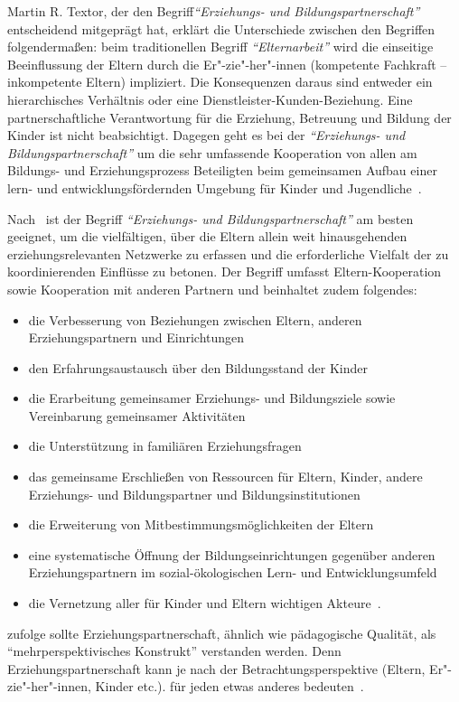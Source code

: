 \documentclass[12pt,a4paper]{article}
\begin{document}
Martin R. Textor, der den Begriff\textit{"`Erziehungs- und Bildungspartnerschaft"'} entscheidend mitgeprägt hat, erklärt die Unterschiede zwischen den Begriffen folgendermaßen: beim traditionellen Begriff \textit{"`Elternarbeit"'} wird die einseitige Beeinflussung der Eltern durch die Er"-zie"-her"-innen (kompetente Fachkraft – inkompetente Eltern) impliziert. Die Konsequenzen daraus sind entweder ein hierarchisches Verhältnis oder eine Dienstleister-Kunden-Beziehung. Eine partnerschaftliche Verantwortung für die Erziehung, Betreuung und Bildung der Kinder ist nicht beabsichtigt. Dagegen geht es bei der \textit{"`Erziehungs- und Bildungspartnerschaft"'} um die sehr umfassende Kooperation von allen am Bildungs- und Erziehungsprozess Beteiligten beim gemeinsamen Aufbau einer lern- und entwicklungsfördernden Umgebung für Kinder und Jugendliche~\parencite{Textor_oJ}.

	Nach~\textcite{Stange_2013} ist der Begriff \textit{"`Erziehungs- und Bildungspartnerschaft"'} am besten geeignet, um die vielfältigen, über die Eltern allein weit hinausgehenden erziehungsrelevanten Netzwerke zu erfassen und die erforderliche Vielfalt der zu koordinierenden Einflüsse zu betonen. Der Begriff umfasst Eltern-Kooperation sowie Kooperation mit anderen Partnern und beinhaltet zudem folgendes:
	\begin{itemize}
\item die Verbesserung von Beziehungen zwischen Eltern, anderen Erziehungspartnern und Einrichtungen
\item den Erfahrungsaustausch über den Bildungsstand der Kinder
\item die Erarbeitung gemeinsamer Erziehungs- und Bildungsziele sowie Vereinbarung gemeinsamer Aktivitäten
\item die Unterstützung in familiären Erziehungsfragen
\item das gemeinsame Erschließen von Ressourcen für Eltern, Kinder, andere Erziehungs- und Bildungspartner und Bildungsinstitutionen
\item die Erweiterung von Mitbestimmungsmöglichkeiten der Eltern
\item eine systematische Öffnung der Bildungseinrichtungen gegenüber anderen Erziehungspartnern im sozial-ökologischen Lern- und Entwicklungsumfeld
\item die Vernetzung aller für Kinder und Eltern wichtigen Akteure~\parencite[S.~14-15]{Stange_2013}.
\end{itemize}

	\textcite{Katz} zufolge sollte Erziehungspartnerschaft, ähnlich wie pädagogische Qualität, als "`mehrperspektivisches Konstrukt"' verstanden werden. Denn Erziehungspartnerschaft kann je nach der Betrachtungsperspektive (Eltern, Er"-zie"-her"-innen, Kinder etc.). für jeden etwas anderes bedeuten~\parencite[S.~226-239]{Katz}.
	
\end{document}
